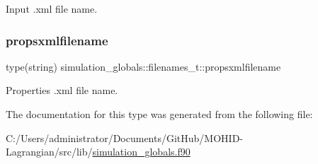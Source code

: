 Input .xml file name. 

\mbox{\label{structsimulation__globals_1_1filenames__t_a7574fc21683b726bc0cc9d41bf8f4513}} 
\subsubsection{\texorpdfstring{propsxmlfilename}{propsxmlfilename}}
{\footnotesize\ttfamily type(string) simulation\+\_\+globals\+::filenames\+\_\+t\+::propsxmlfilename\hspace{0.3cm}{\ttfamily [private]}}



Properties .xml file name. 



The documentation for this type was generated from the following file\+:\begin{DoxyCompactItemize}
\item 
C\+:/\+Users/administrator/\+Documents/\+Git\+Hub/\+M\+O\+H\+I\+D-\/\+Lagrangian/src/lib/\hyperlink{simulation__globals_8f90}{simulation\+\_\+globals.\+f90}\end{DoxyCompactItemize}
